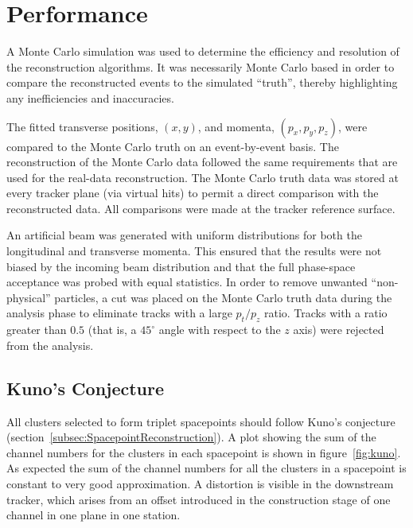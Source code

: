 \section{Performance}
\label{sec:Performance}

  A Monte Carlo simulation was used to determine the efficiency and resolution of the reconstruction algorithms. It was necessarily Monte Carlo based in order to compare the reconstructed events to the simulated ``truth'', thereby highlighting any inefficiencies and inaccuracies.

  The fitted transverse positions, $(x,y)$, and momenta, $(p_x, p_y, p_z)$, were compared to the Monte Carlo truth on an event-by-event basis. The reconstruction of the Monte Carlo data followed the same requirements that are used for the real-data reconstruction. The Monte Carlo truth data was stored at every tracker plane (via virtual hits) to permit a direct comparison with the reconstructed data. All comparisons were made at the tracker reference surface. %

  An artificial beam was generated with uniform distributions for both the longitudinal and transverse momenta. This ensured that the results were not biased by the incoming beam distribution and that the full  phase-space acceptance was probed with equal statistics. In order to remove unwanted ``non-physical'' particles, a cut was placed on the Monte Carlo truth data during the analysis phase to eliminate tracks with a large $p_t/p_z$ ratio. Tracks with a ratio greater than $0.5$ (that is, a $45^\circ$ angle with respect to the $z$ axis) were rejected from the analysis.
 
 
  \subsection{Kuno's Conjecture}
  \label{sec:performance:kunos_conjecture} 
  All clusters selected to form triplet spacepoints should follow Kuno's conjecture (section~\ref{subsec:SpacepointReconstruction}). A plot showing the sum of the channel numbers for the clusters in each spacepoint is shown in figure~\ref{fig:kuno}. As expected the sum of the channel numbers for all the clusters in a spacepoint is constant to very good approximation. A distortion is visible in the downstream tracker, which arises from an offset introduced in the construction stage of one channel in one plane in one station. 
  


